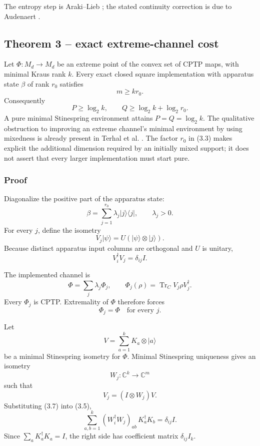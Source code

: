 \documentclass[11pt,a4paper]{article}
\numberwithin{equation}{section}
\begin{document}
The entropy step is Araki--Lieb \citep{araki1970}; the stated continuity
correction is due to Audenaert \citep{audenaert2007}.

\subsection*{Theorem 3 -- exact extreme-channel
cost}\label{theorem-3-exact-extreme-channel-cost}

Let \(\Phi:M_d\to M_d\) be an extreme point of the convex set of CPTP
maps, with minimal Kraus rank \(k\). Every exact closed square
implementation with apparatus state \(\beta\) of rank \(r_0\) satisfies
\[
m\ge kr_0.
\tag{3.3}
\] Consequently \[
P\ge\log_2k,\qquad Q\ge\log_2k+\log_2r_0.
\tag{3.4}
\] A pure minimal Stinespring environment attains \(P=Q=\log_2k\). The
qualitative obstruction to improving an extreme channel's minimal
environment by using mixedness is already present in Terhal et al.
\citep{terhal1999}. The factor \(r_0\) in (3.3) makes explicit the
additional dimension required by an initially mixed support; it does not
assert that every larger implementation must start pure.

\subsubsection{Proof}\label{proof-2}

Diagonalize the positive part of the apparatus state: \[
\beta=\sum_{j=1}^{r_0}
\lambda_j|j\rangle\langle j|,
\qquad\lambda_j>0.
\] For every \(j\), define the isometry \[
V_j|\psi\rangle
=
U(|\psi\rangle\otimes|j\rangle).
\] Because distinct apparatus input columns are orthogonal and \(U\) is
unitary, \[
V_i^\dagger V_j=\delta_{ij}I.
\tag{3.5}
\]

The implemented channel is \[
\Phi=\sum_j\lambda_j\Phi_j,
\qquad
\Phi_j(\rho)=\operatorname{Tr}_C V_j\rho V_j^\dagger.
\] Every \(\Phi_j\) is CPTP. Extremality of \(\Phi\) therefore forces \[
\Phi_j=\Phi
\quad\text{for every }j.
\tag{3.6}
\]

Let \[
V=\sum_{a=1}^kK_a\otimes|a\rangle
\] be a minimal Stinespring isometry for \(\Phi\). Minimal Stinespring
uniqueness \citep{stinespring1955} gives an isometry \[
W_j:\mathbb C^k\to\mathbb C^m
\] such that \[
V_j=(I\otimes W_j)V.
\tag{3.7}
\] Substituting (3.7) into (3.5), \[
\sum_{a,b=1}^k
(W_i^\dagger W_j)_{ab}\,
K_a^\dagger K_b
=
\delta_{ij}I.
\tag{3.8}
\] Since \(\sum_aK_a^\dagger K_a=I\), the right side has coefficient
matrix \(\delta_{ij}I_k\).
\end{document}
